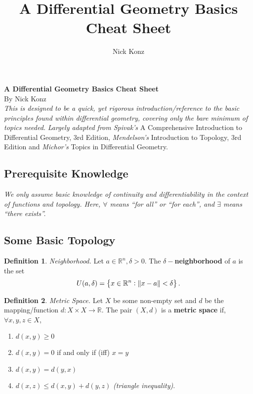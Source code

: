 \documentclass[10pt,landscape]{article}
\title{A Differential Geometry Basics Cheat Sheet}
\author{Nick Konz}
\theoremstyle{definition}
\newtheorem{definition}{Definition}[section]
\theoremstyle{theorem}
\theoremstyle{summary}
\theoremstyle{remark}
\newcommand{\R}{\mathbb{R}}
\newcommand{\Rn}{\mathbb{R}^n}
\begin{document}
\begin{center}
     \Large{\textbf{A Differential Geometry Basics Cheat Sheet}} \\
     \small{By Nick Konz}\\
     \textit{This is designed to be a quick, yet rigorous introduction/reference to the basic principles found within differential geometry, covering only the bare minimum of topics needed.}
     \small{\textit{Largely adapted from Spivak's} {A Comprehensive Introduction to Differential Geometry, 3rd Edition}, \textit{Mendelson's} Introduction to Topology, 3rd Edition and \textit{Michor's} Topics in Differential Geometry.}
\end{center}
\begin{multicols*}{3}

\section{Prerequisite Knowledge}
\textit{We only assume basic knowledge of continuity and differentiability in the context of functions and topology. Here, $\forall$ means ``for all'' or ``for each'', and $\exists$ means ``there exists''.}
\subsection{Some Basic Topology}

\theoremstyle{definition}
\begin{definition}{\textit{Neighborhood.}}
Let $a\in\Rn, \delta > 0$. The $\delta-$\textbf{neighborhood} of $a$ is the set
\begin{equation}
    U(a,\delta)=\left\{x\in\Rn:\norm{x-a}<\delta\right\}.
\end{equation}
\end{definition}

\theoremstyle{definition}
\begin{definition}{\textit{Metric Space.}}
Let $X$ be some non-empty set and $d$ be the mapping/function $d:X\times X\rightarrow \R$. The pair $(X,d)$ is a \textbf{metric space} if, $\forall x,y,z\in X$,
\begin{enumerate}
    \item $d(x,y) \geq 0$
    \item $d(x,y) = 0$ if and only if (iff) $x = y$
    \item $d(x,y)=d(y,x)$
    \item $d(x,z)\leq d(x,y) + d(y,z)$ \textit{(triangle inequality)}.
\end{enumerate}
\end{definition}


\end{multicols*}
\end{document}
